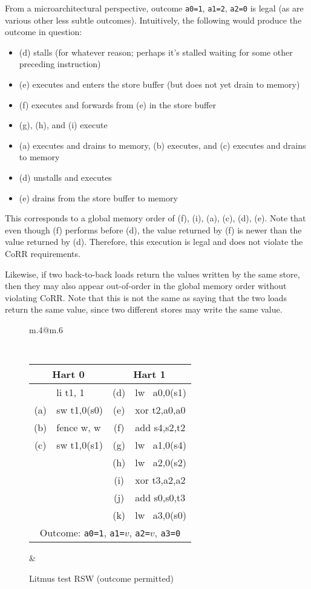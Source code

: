 From a microarchitectural perspective, outcome {\tt a0=1}, {\tt a1=2}, {\tt a2=0} is legal (as are various other less subtle outcomes).  Intuitively, the following would produce the outcome in question:
\begin{itemize}
  \item (d) stalls (for whatever reason; perhaps it's stalled waiting for some other preceding instruction)
  \item (e) executes and enters the store buffer (but does not yet drain to memory)
  \item (f) executes and forwards from (e) in the store buffer
  \item (g), (h), and (i) execute
  \item (a) executes and drains to memory, (b) executes, and (c) executes and drains to memory
  \item (d) unstalls and executes
  \item (e) drains from the store buffer to memory
\end{itemize}
This corresponds to a global memory order of (f), (i), (a), (c), (d), (e).
Note that even though (f) performs before (d), the value returned by (f) is newer than the value returned by (d).
Therefore, this execution is legal and does not violate the CoRR requirements.

Likewise, if two back-to-back loads return the values written by the same store, then they may also appear out-of-order in the global memory order without violating CoRR.  Note that this is not the same as saying that the two loads return the same value, since two different stores may write the same value.

\begin{figure}[h!]
  \centering
  \begin{tabular}{m{.4\linewidth}@{\qquad\quad}m{.6\linewidth}}
  {
    \tt\small
    \begin{tabular}{cl||cl}
    \multicolumn{2}{c}{Hart 0} & \multicolumn{2}{c}{Hart 1} \\
    \hline
          & li t1, 1    & (d) & lw~ a0,0(s1) \\
      (a) & sw t1,0(s0) & (e) & xor t2,a0,a0 \\
      (b) & fence w, w  & (f) & add s4,s2,t2 \\
      (c) & sw t1,0(s1) & (g) & lw~ a1,0(s4) \\
          &             & (h) & lw~ a2,0(s2) \\
          &             & (i) & xor t3,a2,a2 \\
          &             & (j) & add s0,s0,t3 \\
          &             & (k) & lw~ a3,0(s0) \\
      \hline
      \multicolumn{4}{c}{Outcome: {\tt a0=1}, {\tt a1=$v$}, {\tt a2=$v$}, {\tt a3=0}}
    \end{tabular}
  }
  &
  
   \end{tabular}
  \caption{Litmus test RSW (outcome permitted)}
  \label{fig:litmus:rsw}
\end{figure}

